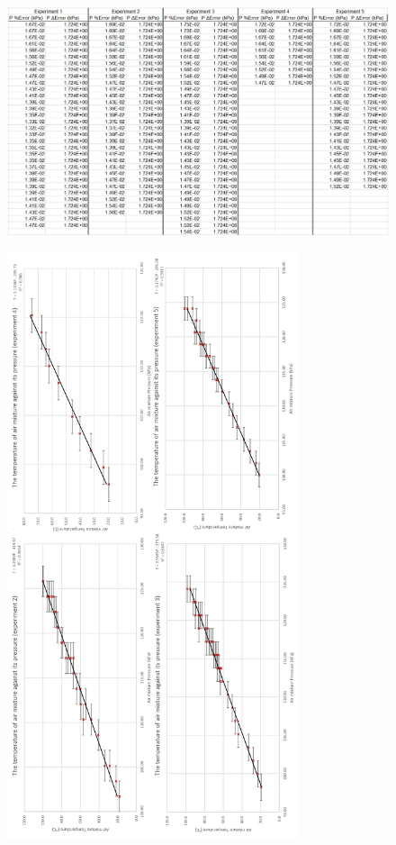 \documentclass[a4paper,12pt]{article}
\begin{document}
\begin{figure}[H]
    \centering
    \includegraphics[width=\textwidth]{assets/unitdata_unc.png}
    \label{fig:upq}
\end{figure}


\begin{figure}[H]
    \centering
    \includegraphics[width=0.76\textwidth]{assets/graphs.png}
    \label{fig:dg25}
\end{figure}
\end{document}
